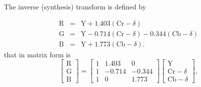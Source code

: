 The inverse (synthesis) transform is defined by
\begin{comment}
\begin{equation}
  \begin{bmatrix}
    \text{R} \\
    \text{G} \\
    \text{B}
  \end{bmatrix}
  =
  \begin{bmatrix}
    1  &  1.402  & 0 \\ 
    1  &  -0.714  &  -0.344 \\ 
    1  & 0  & 1.772
  \end{bmatrix}
  \begin{bmatrix}
    \text{Y} \\
    \text{Cr} \\
    \text{Cb}
  \end{bmatrix},
\end{equation}
or alternatively, by
\end{comment}
\begin{equation}
  \begin{array}{lcl}
    \text{R} & = & \text{Y} + 1.403(\text{Cr} - \delta) \\
    \text{G} & = & \text{Y} - 0.714(\text{Cr} - \delta) - 0.344(\text{Cb} - \delta)\\
    \text{B} & = & \text{Y} + 1.773(\text{Cb} - \delta).
  \end{array}
  \label{eq:iYCrCb}
\end{equation}
that in matrix form is
\begin{equation}
  \begin{bmatrix}
    \text{R} \\
    \text{G} \\
    \text{B}
  \end{bmatrix}
  =
  \begin{bmatrix}
    1  &  1.403  & 0 \\ 
    1  &  -0.714  &  -0.344 \\ 
    1  & 0  & 1.773
  \end{bmatrix}
  \begin{bmatrix}
    \text{Y} \\
    \text{Cr}-\delta \\
    \text{Cb}-\delta
  \end{bmatrix},
\end{equation}

